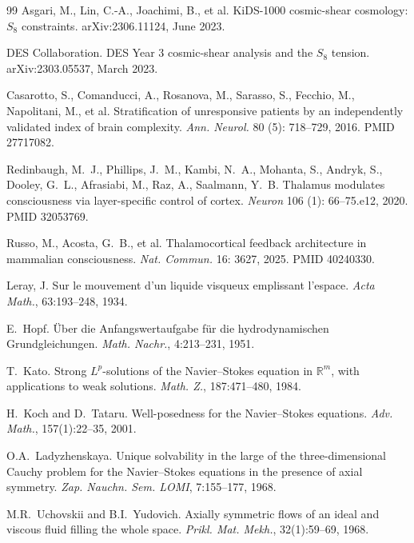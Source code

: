 \documentclass[11pt,a4paper]{amsart}
\theoremstyle{plain}
\theoremstyle{definition}
\begin{document}
\begin{thebibliography}{99}
Asgari, M., Lin, C.-A., Joachimi, B., et al.
\newblock KiDS-1000 cosmic-shear cosmology: $S_8$ constraints.
\newblock arXiv:2306.11124, June 2023.

DES Collaboration.
\newblock DES Year 3 cosmic-shear analysis and the $S_8$ tension.
\newblock arXiv:2303.05537, March 2023.

Casarotto, S., Comanducci, A., Rosanova, M., Sarasso, S., Fecchio, M., Napolitani, M., et al.
\newblock Stratification of unresponsive patients by an independently validated index of brain complexity.
\newblock \emph{Ann. Neurol.} 80 (5): 718--729, 2016. PMID 27717082.

Redinbaugh, M.~J., Phillips, J.~M., Kambi, N.~A., Mohanta, S., Andryk, S., Dooley, G.~L., Afrasiabi, M., Raz, A., Saalmann, Y.~B.
\newblock Thalamus modulates consciousness via layer-specific control of cortex.
\newblock \emph{Neuron} 106 (1): 66--75.e12, 2020. PMID 32053769.

Russo, M., Acosta, G.~B., et al.
\newblock Thalamocortical feedback architecture in mammalian consciousness.
\newblock \emph{Nat. Commun.} 16: 3627, 2025. PMID 40240330.

Leray, J.
\newblock Sur le mouvement d'un liquide visqueux emplissant l'espace.
\newblock \emph{Acta Math.}, 63:193--248, 1934.

E.~Hopf.
\newblock \"Uber die Anfangswertaufgabe f\"ur die hydrodynamischen Grundgleichungen.
\newblock \emph{Math. Nachr.}, 4:213--231, 1951.

T.~Kato.
\newblock Strong $L^p$-solutions of the Navier--Stokes equation in $\mathbb{R}^m$, with applications to weak solutions.
\newblock \emph{Math. Z.}, 187:471--480, 1984.

H.~Koch and D.~Tataru.
\newblock Well-posedness for the Navier--Stokes equations.
\newblock \emph{Adv. Math.}, 157(1):22--35, 2001.

O.A.~Ladyzhenskaya.
\newblock Unique solvability in the large of the three-dimensional Cauchy problem for the Navier--Stokes equations in the presence of axial symmetry.
\newblock \emph{Zap. Nauchn. Sem. LOMI}, 7:155--177, 1968.

M.R.~Uchovskii and B.I.~Yudovich.
\newblock Axially symmetric flows of an ideal and viscous fluid filling the whole space.
\newblock \emph{Prikl. Mat. Mekh.}, 32(1):59--69, 1968.


\end{thebibliography}
\end{document}
